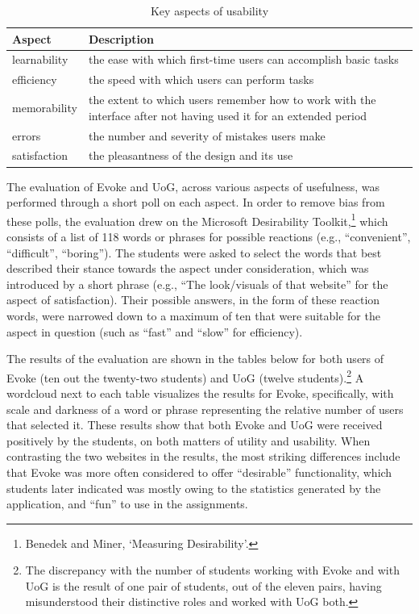 \begin{table}[htbp]
    \centering
    \begin{tabular}{p{1in}p{3.75in}}
    \toprule
        \textbf{Aspect} & \textbf{Description} \\ 
    \midrule
        learnability & the ease with which first-time users can accomplish basic tasks \\
        efficiency & the speed with which users can perform tasks \\
        memorability & the extent to which users remember how to work with the interface after not having used it for an extended period \\
        errors & the number and severity of mistakes users make \\
        satisfaction & the pleasantness of the design and its use \\
    \midrule
    \end{tabular}
    \caption[]{\label{table:Stolk2021x:eval:usability-aspects}Key aspects of usability}
\end{table}


The evaluation of Evoke and UoG, across various aspects of usefulness, was performed through a short poll on each aspect. In order to remove bias from these polls, the evaluation drew on the Microsoft Desirability Toolkit,\footnote{Benedek and Miner, `Measuring Desirability'.} which consists of a list of 118 words or phrases for possible reactions (e.g., ``convenient'', ``difficult'', ``boring''). The students were asked to select the words that best described their stance towards the aspect under consideration, which was introduced by a short phrase (e.g., ``The look/visuals of that website'' for the aspect of satisfaction). Their possible answers, in the form of these reaction words, were narrowed down to a maximum of ten that were suitable for the aspect in question (such as ``fast'' and ``slow'' for efficiency). 

The results of the evaluation are shown in the tables below for both users of Evoke (ten out the twenty-two students) and UoG (twelve students).\footnote{The discrepancy with the number of students working with Evoke and with UoG is the result of one pair of students, out of the eleven pairs, having misunderstood their distinctive roles and worked with UoG both.} A wordcloud next to each table visualizes the results for Evoke, specifically, with scale and darkness of a word or phrase representing the relative number of users that selected it. These results show that both Evoke and UoG were received positively by the students, on both matters of utility and usability. When contrasting the two websites in the results, the most striking differences include that Evoke was more often considered to offer ``desirable'' functionality, which students later indicated was mostly owing to the statistics generated by the application, and ``fun'' to use in the assignments. 

